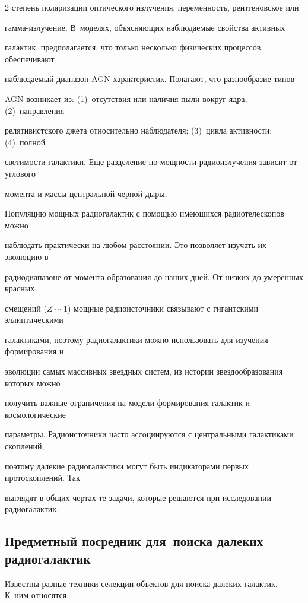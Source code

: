 \begin{multicols}{2}
степень поляризации оптического излучения, переменность, рентгеновское или 

  гам\-ма-из\-лу\-че\-ние. В~моделях, объясняющих наблюдаемые свойства активных 

галактик, предполагается, что только несколько физических процессов обеспечивают 

наблюдаемый диапазон AGN-ха\-рак\-те\-ри\-стик. Полагают, что разнообразие типов 

AGN возникает из: (1)~отсутствия или наличия пыли вокруг ядра; (2)~направления 

релятивистского джета относительно наблюдателя; (3)~цикла активности; (4)~полной 

светимости галактики. Еще разделение по мощ\-ности радиоизлучения зависит от углового 

момента и массы центральной черной дыры. 

  

  Популяцию мощных радиогалактик с по\-мощью имеющихся радиотелескопов можно 

наблюдать практически на любом расстоянии. Это позволяет изучать их эволюцию в 

радиодиапазоне от момента образования до наших дней. От низких до умеренных красных 

смещений ($Z\sim1$) мощные радиоисточники связывают с гигантскими эл\-лип\-ти\-че\-ски\-ми 

галактиками, поэтому радиогалактики можно использовать для изучения формирования и 

эволюции самых массивных звездных систем, из истории звездообразования которых можно 

получить важные ограничения на модели формирования галактик и космологические 

параметры. Радиоисточники часто ассоциируются с центральными галактиками скоплений, 

поэтому далекие радиогалактики могут быть индикаторами первых протоскоплений. Так 

выглядят в общих чертах те задачи, которые решаются при исследовании радиогалактик.



\subsection{Предметный посредник для~поиска далеких радиогалактик}

 

Известны разные техники селекции объектов для поиска далеких галактик. К~ним относятся: 


\end{multicols}
